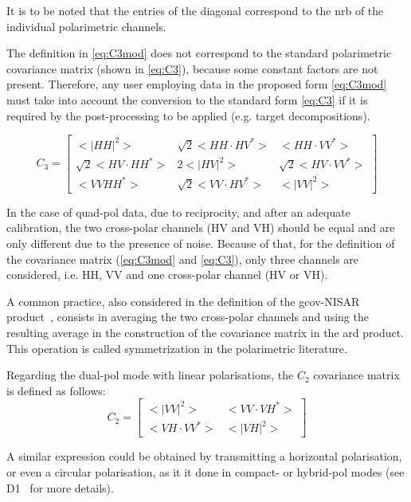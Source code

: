 It is to be noted that the entries of the diagonal correspond to the \acs{nrb} of the individual polarimetric channels. 

The definition in \eqref{eq:C3mod} does not correspond to the standard polarimetric covariance matrix (shown in \eqref{eq:C3}), because some constant factors are not present. Therefore, any user employing data in the proposed form \eqref{eq:C3mod} must take into account the conversion to the standard form \eqref{eq:C3} if it is required by the post-processing to be applied (e.g. target decompositions).

\begin{equation}
    C_{3} =
    \begin{bmatrix}
    <|HH|^2>               & \sqrt 2 <HH \cdot HV^*> & <HH  \cdot VV^*> \\
    \sqrt 2 <HV\cdot HH^*> & 2 <|HV|^2>              & \sqrt 2 <HV\cdot VV^*> \\
    <VV HH^*>              & \sqrt 2 <VV \cdot HV^*> &     <|VV|^2>
    \end{bmatrix} \label{eq:C3}
\end{equation}

 In the case of quad-pol data, due to reciprocity, and after an adequate calibration, the two cross-polar channels (HV and VH) should be equal and are only different due to the presence of noise. Because of that, for the definition of the covariance matrix (\eqref{eq:C3mod} and \eqref{eq:C3}), only three channels are considered, i.e. HH, VV and one cross-polar channel (HV or VH). 

A common practice, also considered in the definition of the \acs{gcov}-NISAR product~\cite{NISAR_GCOV_ProdSpec}, consists in averaging the two cross-polar channels and using the resulting average in the construction of the covariance matrix in the \acs{ard} product. This operation is called symmetrization in the polarimetric literature.

Regarding the dual-pol mode with linear polarisations, the $C_2$ covariance matrix is defined as follows:
\begin{equation}
C_{2} =
    \begin{bmatrix}
    <|VV|^2>       & <VV \cdot VH^*> \\
    <VH\cdot VV^*> & <|VH|^2>
    \end{bmatrix} \label{eq:C2vh}
\end{equation}

A similar expression could be obtained by transmitting a horizontal polarisation, or even a circular polarisation, as it it done in compact- or hybrid-pol modes (see D1~\cite{D1} for more details).


